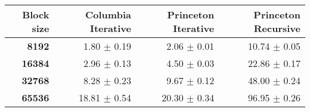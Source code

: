\begin{tabular}{rrrr}\toprule
\textbf{Block size}  & \textbf{Columbia Iterative} & \textbf{Princeton Iterative} & \textbf{Princeton Recursive}\\\midrule
\textbf{8192}  & 1.80 $\pm$ 0.19 & 2.06 $\pm$ 0.01 & 10.74 $\pm$ 0.05\\
\textbf{16384}  & 2.96 $\pm$ 0.13 & 4.50 $\pm$ 0.03 & 22.86 $\pm$ 0.17\\
\textbf{32768}  & 8.28 $\pm$ 0.23 & 9.67 $\pm$ 0.12 & 48.00 $\pm$ 0.24\\
\textbf{65536} & 18.81 $\pm$ 0.54 & 20.30 $\pm$ 0.34 & 96.95 $\pm$ 0.26\\
\bottomrule
\end{tabular}
